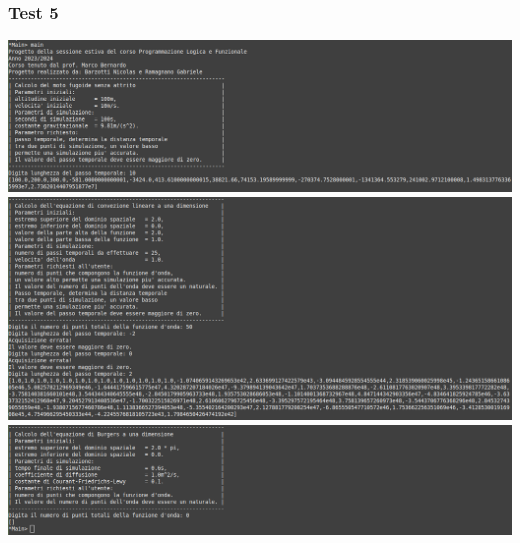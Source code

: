 \subsubsection*{Test 5}
\includegraphics[width=\textwidth,height=\textheight,keepaspectratio]{05_testing/image/hs/05_test/01_misto.png}
\\
\includegraphics[width=\textwidth,height=\textheight,keepaspectratio]{05_testing/image/hs/05_test/03_misto.png}
\\
\includegraphics[width=\textwidth,height=\textheight,keepaspectratio]{05_testing/image/hs/05_test/04_misto.png}

